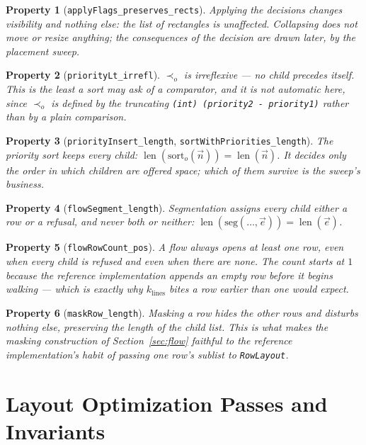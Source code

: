 \documentclass[11pt,a4paper]{article}
\newcommand{\jv}[1]{\texttt{#1}}       %
\DeclareMathOperator{\len}{len}
\theoremstyle{definition}
\theoremstyle{plain}
\newtheorem{property}{Property}[section]
\theoremstyle{remark}
\begin{document}
\begin{property}[\texttt{applyFlags\_preserves\_rects}]
Applying the decisions changes visibility and nothing else: the list of
rectangles is unaffected. Collapsing does not move or resize anything; the
consequences of the decision are drawn later, by the placement sweep.
\end{property}

\begin{property}[\texttt{priorityLt\_irrefl}]
$\prec_o$ is irreflexive --- no child precedes itself. This is the least a sort
may ask of a comparator, and it is not automatic here, since $\prec_o$ is
defined by the truncating \jv{(int) (priority2 - priority1)} rather than by a
plain comparison.
\end{property}

\begin{property}[\texttt{priorityInsert\_length}, \texttt{sortWithPriorities\_length}]
The priority sort keeps every child: $\len(\mathrm{sort}_o(\vec{n})) =
\len(\vec{n})$. It decides only the order in which children are offered space;
which of them survive is the sweep's business.
\end{property}

\begin{property}[\texttt{flowSegment\_length}]
Segmentation assigns every child either a row or a refusal, and never both or
neither: $\len(\mathrm{seg}(\ldots, \vec{e})) = \len(\vec{e})$.
\end{property}

\begin{property}[\texttt{flowRowCount\_pos}]
A flow always opens at least one row, even when every child is refused and even
when there are none. The count starts at $1$ because the reference
implementation appends an empty row before it begins walking --- which is
exactly why $k_{\mathrm{lines}}$ bites a row earlier than one would expect.
\end{property}

\begin{property}[\texttt{maskRow\_length}]
Masking a row hides the other rows and disturbs nothing else, preserving the
length of the child list. This is what makes the masking construction of
Section~\ref{sec:flow} faithful to the reference implementation's habit of
passing one row's sublist to \jv{RowLayout}.
\end{property}

\section{Layout Optimization Passes and Invariants}
\label{sec:optimizations}
\end{document}
